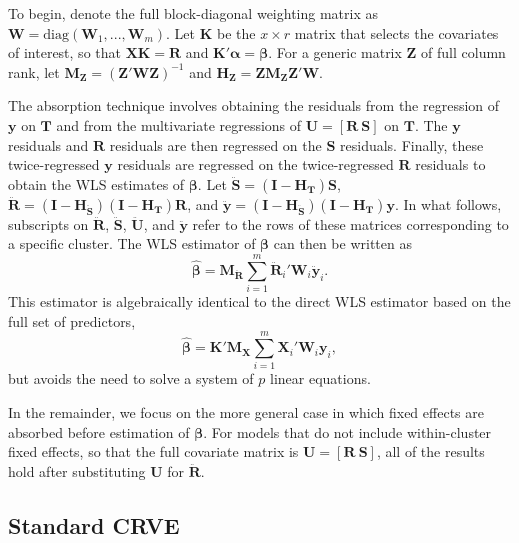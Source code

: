 \documentclass[draft]{ectaart}\usepackage[]{graphicx}\usepackage[]{color}
\newcommand{\bm}{\mathbf}
\newcommand{\bs}{\boldsymbol}
\begin{document}
To begin, denote the full block-diagonal weighting matrix as $\bm{W} = \text{diag}\left(\bm{W}_1,...,\bm{W}_m\right)$.
Let $\bm{K}$ be the $x \times r$ matrix that selects the covariates of interest, so that $\bm{X} \bm{K} = \bm{R}$ and $\bm{K}'\bs\alpha = \bs\beta$.
For a generic matrix $\bm{Z}$ of full column rank, let $\bm{M_Z} = \left(\bm{Z}'\bm{W}\bm{Z}\right)^{-1}$ and $\bm{H_Z} = \bm{Z}\bm{M_Z}\bm{Z}'\bm{W}$. 

The absorption technique involves obtaining the residuals from the regression of $\bm{y}$ on $\bm{T}$ and from the multivariate regressions of $\bm{U} = [\bm{R}\ \bm{S}]$ on $\bm{T}$. 
The $\bm{y}$ residuals and $\bm{R}$ residuals are then regressed on the $\bm{S}$ residuals. 
Finally, these twice-regressed $\bm{y}$ residuals are regressed on the twice-regressed $\bm{R}$ residuals to obtain the WLS estimates of $\bs\beta$. 
Let $\bm{\ddot{S}} = \left(\bm{I} - \bm{H_T}\right)\bm{S}$, $\bm{\ddot{R}} = \left(\bm{I} - \bm{H_{\ddot{S}}}\right)\left(\bm{I} - \bm{H_T}\right)\bm{R}$, and $\bm{\ddot{y}} = \left(\bm{I} - \bm{H_{\ddot{S}}}\right)\left(\bm{I} - \bm{H_T}\right)\bm{y}$. 
In what follows, subscripts on $\bm{\ddot{R}}$, $\bm{\ddot{S}}$,  $\bm{\ddot{U}}$, and $\bm{\ddot{y}}$ refer to the rows of these matrices corresponding to a specific cluster. 
The WLS estimator of $\bs\beta$ can then be written as
\begin{equation}
\label{eq:WLS}
\bs{\hat\beta} = \bm{M_{\ddot{R}}} \sum_{i=1}^m \bm{\ddot{R}}_i' \bm{W}_i \bm{\ddot{y}}_i. 
\end{equation}
This estimator is algebraically identical to the direct WLS estimator based on the full set of predictors, \[
\bs{\hat\beta} = \bm{K}'\bm{M_X} \sum_{i=1}^m \bm{X}_i' \bm{W}_i \bm{y}_i,
\]
but avoids the need to solve a system of $p$ linear equations.

In the remainder, we focus on the more general case in which fixed effects are absorbed before estimation of $\bs\beta$. For models that do not include within-cluster fixed effects, so that the full covariate matrix is $\bm{U} = \left[\bm{R} \ \bm{S}\right]$, all of the results hold after substituting $\bm{U}$ for $\bm{\ddot{R}}$. 

\subsection{Standard CRVE}
\end{document}
